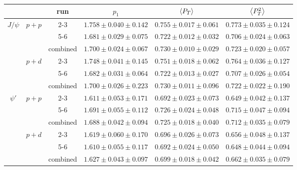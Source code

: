 \begin{tabular}{c|c|c|c|c|cl}
\hline
 &                        & run      & $p_1$                   & $\expval{P_T}$          & \multicolumn{2}{c}{$\expval{P^2_T}$}        \\ \hline
\multirow{6}{*}{$J/\psi$} & \multirow{3}{*}{$p+p$} & 2-3 & $1.758\pm0.040\pm0.142$ & $0.755\pm0.017\pm0.061$ & \multicolumn{2}{c}{$0.773\pm0.035\pm0.124$} \\ \cline{3-7} 
 &                        & 5-6      & $1.681\pm0.029\pm0.075$ & $0.722\pm0.012\pm0.032$ & \multicolumn{2}{c}{$0.706\pm0.024\pm0.063$} \\ \cline{3-7} 
 &                        & combined & $1.700\pm0.024\pm0.067$ & $0.730\pm0.010\pm0.029$ & \multicolumn{2}{c}{$0.723\pm0.020\pm0.057$} \\ \cline{2-7} 
 & \multirow{3}{*}{$p+d$} & 2-3      & $1.748\pm0.041\pm0.145$ & $0.751\pm0.018\pm0.062$ & \multicolumn{2}{c}{$0.764\pm0.036\pm0.127$} \\ \cline{3-7} 
 &                        & 5-6      & $1.682\pm0.031\pm0.064$ & $0.722\pm0.013\pm0.027$ & \multicolumn{2}{c}{$0.707\pm0.026\pm0.054$} \\ \cline{3-7} 
 &                        & combined & $1.700\pm0.026\pm0.223$ & $0.730\pm0.011\pm0.096$ & \multicolumn{2}{c}{$0.722\pm0.022\pm0.190$} \\ \hline
\multirow{6}{*}{$\psi'$}  & \multirow{3}{*}{$p+p$} & 2-3 & $1.611\pm0.053\pm0.171$ & $0.692\pm0.023\pm0.073$ & \multicolumn{2}{c}{$0.649\pm0.042\pm0.137$} \\ \cline{3-7} 
 &                        & 5-6      & $1.691\pm0.055\pm0.112$ & $0.726\pm0.024\pm0.048$ & \multicolumn{2}{c}{$0.715\pm0.047\pm0.094$} \\ \cline{3-7} 
 &                        & combined & $1.688\pm0.042\pm0.094$ & $0.725\pm0.018\pm0.040$ & \multicolumn{2}{c}{$0.712\pm0.035\pm0.079$} \\ \cline{2-7} 
 & \multirow{3}{*}{$p+d$} & 2-3      & $1.619\pm0.060\pm0.170$ & $0.696\pm0.026\pm0.073$ & \multicolumn{2}{c}{$0.656\pm0.048\pm0.137$} \\ \cline{3-7} 
 &                        & 5-6      & $1.610\pm0.055\pm0.117$ & $0.692\pm0.024\pm0.050$ & \multicolumn{2}{c}{$0.648\pm0.044\pm0.094$} \\ \cline{3-7} 
 &                        & combined & $1.627\pm0.043\pm0.097$ & $0.699\pm0.018\pm0.042$ & \multicolumn{2}{c}{$0.662\pm0.035\pm0.079$} \\ \hline
\end{tabular}
